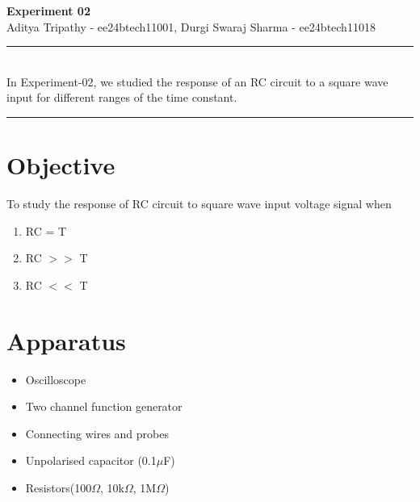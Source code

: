 \documentclass[a4paper,12pt]{article}
\renewenvironment{abstract}
 {\par\noindent\textbf{\abstractname}\ \ignorespaces \\}
 {\par\noindent\medskip}
\begin{document}
\pagestyle{fancy}
\thispagestyle{empty}
\fancyhead[L]{}
\renewcommand*{\thefootnote}{\fnsymbol{footnote}}
\begin{center}
\Large{\textbf{Experiment 02}}
\vspace{0.4cm}
\normalsize
\\ Aditya Tripathy - ee24btech11001, Durgi Swaraj Sharma - ee24btech11018\\
\medskip
\normalsize
\end{center}
{\color{gray}\hrule}
\vspace{0.4cm}
\begin{abstract}
In Experiment-02, we studied the response of an RC circuit to a square wave input for different ranges of the time constant.
\end{abstract}
{\color{gray}\hrule}
\medskip
\section{Objective}
To study the response of RC circuit to square wave input voltage signal when 
\begin{enumerate}
  \item RC = T
  \item RC $>>$ T
  \item RC $<<$ T
\end{enumerate}
\section{Apparatus}
\begin{itemize}
\item Oscilloscope
\item Two channel function generator
\item Connecting wires and probes
\item Unpolarised capacitor (0.1$\mu$F)
\item Resistors(100$\Omega$, 10k$\Omega$, 1M$\Omega$)
\end{itemize}
\end{document}
